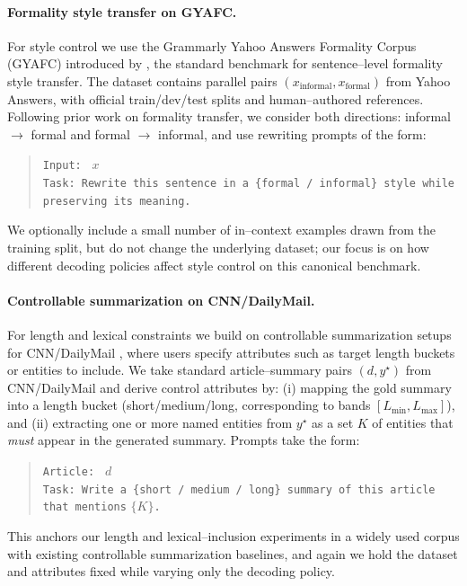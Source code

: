 \paragraph{Formality style transfer on GYAFC.}
For style control we use the Grammarly Yahoo Answers Formality Corpus (GYAFC)
introduced by \citet{rao2018gyafc}, the standard benchmark for sentence--level
formality style transfer. The dataset contains parallel pairs
$(x_{\text{informal}}, x_{\text{formal}})$ from Yahoo Answers, with official
train/dev/test splits and human--authored references. Following prior work on
formality transfer, we consider both directions:
informal $\rightarrow$ formal and formal $\rightarrow$ informal, and use
rewriting prompts of the form:
\begin{quote}\small
\texttt{Input: } $x$ \\[0.25em]
\texttt{Task: Rewrite this sentence in a \{formal / informal\} style while
preserving its meaning.}
\end{quote}
We optionally include a small number of in--context examples drawn from the
training split, but do not change the underlying dataset; our focus is on how
different decoding policies affect style control on this canonical benchmark.

\paragraph{Controllable summarization on CNN/DailyMail.}
For length and lexical constraints we build on controllable summarization setups
for CNN/DailyMail
\citep{fan2018controllable,he2020ctrlsum,chan2021constrained}, where users
specify attributes such as target length buckets or entities to include.
We take standard article--summary pairs $(d, y^\star)$ from CNN/DailyMail and
derive control attributes by:
(i) mapping the gold summary into a length bucket
(short/medium/long, corresponding to bands $[L_{\min},L_{\max}]$), and
(ii) extracting one or more named entities from $y^\star$ as a set $K$ of
entities that \emph{must} appear in the generated summary.
Prompts take the form:
\begin{quote}\small
\texttt{Article: } $d$ \\[0.25em]
\texttt{Task: Write a \{short / medium / long\} summary of this article that
mentions} $\{K\}$\texttt{.}
\end{quote}
This anchors our length and lexical--inclusion experiments in a widely used
corpus with existing controllable summarization baselines, and again we hold
the dataset and attributes fixed while varying only the decoding policy.

